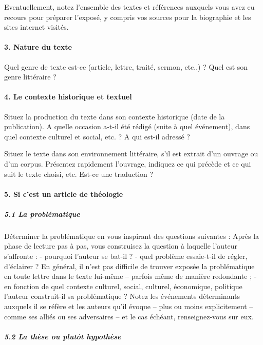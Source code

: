 Eventuellement, notez l’ensemble des textes et références auxquels vous avez eu recours pour préparer l’exposé, y compris vos sources pour la biographie et les sites internet visités. 

\paragraph{3.	Nature du texte}

Quel genre de texte est-ce (article, lettre, traité, sermon, etc..) ? Quel est son genre littéraire ?

\paragraph{4.	Le contexte historique et textuel}

Situez la production du texte dans son contexte historique (date de la publication). A quelle occasion a-t-il été rédigé (suite à quel événement), dans quel contexte culturel et social, etc. ? A qui est-il adressé ?

Situez le texte dans son environnement littéraire, s’il est extrait d’un ouvrage ou d’un corpus. Présentez rapidement l’ouvrage, indiquez ce qui précède et ce qui suit le texte choisi, etc. Est-ce une traduction ? 

\paragraph{5.	Si c’est un article de théologie}


	\subparagraph{5.1 La problématique }

Déterminer la problématique en vous inspirant des questions suivantes :
Après la phase de lecture pas à pas, vous construisez la question à laquelle l’auteur s’affronte :
-	pourquoi l’auteur se bat-il ?
-	quel problème essaie-t-il de régler, d’éclairer ? En général, il n’est pas difficile de trouver exposée la problématique en toute lettre dans le texte lui-même – parfois même de manière redondante ;
-	en fonction de quel contexte culturel, social, culturel, économique, politique l’auteur construit-il sa problématique ? Notez les événements déterminants auxquels il se réfère et les auteurs qu’il évoque – plus ou moins explicitement – comme ses alliés ou ses adversaires – et le cas échéant, renseignez-vous sur eux. 

\subparagraph{5.2	 La thèse ou plutôt hypothèse}

